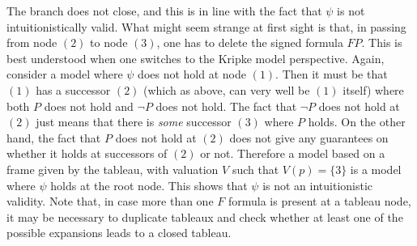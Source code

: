 \begin{center}
\end{center}

The branch does not close, and this is in line with the fact that $\psi$ is not intuitionistically valid. What might seem strange at first sight is that, in passing from node $(2)$ to node $(3)$, one has to delete the signed formula $FP$. This is best understood when one switches to the Kripke model perspective. Again, consider a model where $\psi$ does not hold at node $(1)$. Then it must be that $(1)$ has a successor $(2)$ (which as above, can very well be $(1)$ itself) where both $P$ does not hold and $\neg P$ does not hold. The fact that $\neg P$ does not hold at $(2)$ just means that there is \textit{some} successor $(3)$ where $P$ holds. On the other hand, the fact that $P$ does not hold at $(2)$ does not give any guarantees on whether it holds at successors of $(2)$ or not. Therefore a model based on a frame given by the tableau, with valuation $V$ such that $V(p)=\{3\}$ is a model where $\psi$ holds at the root node. This shows that $\psi$ is not an intuitionistic validity. Note that, in case more than one $F$ formula is present at a tableau node, it may be necessary to duplicate tableaux and check whether at least one of the possible expansions leads to a closed tableau.
